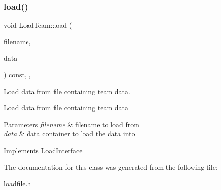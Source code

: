 \subsubsection{\texorpdfstring{load()}{load()}}
{\footnotesize\ttfamily void Load\+Team\+::load (\begin{DoxyParamCaption}\item[{std\+::string}]{filename,  }\item[{\mbox{\hyperlink{classFileDataContainer}{File\+Data\+Container}} $\ast$}]{data }\end{DoxyParamCaption}) const\hspace{0.3cm}{\ttfamily [inline]}, {\ttfamily [override]}, {\ttfamily [virtual]}}



Load data from file containing team data. 

Load data from file containing team data 
\begin{DoxyParams}{Parameters}
{\em filename} & filename to load from \\
\hline
{\em data} & data container to load the data into \\
\hline
\end{DoxyParams}


Implements \mbox{\hyperlink{classLoadInterface_a91bdc01550e64219c4007afce054fd40}{Load\+Interface}}.



The documentation for this class was generated from the following file\+:\begin{DoxyCompactItemize}
\item 
loadfile.\+h\end{DoxyCompactItemize}
